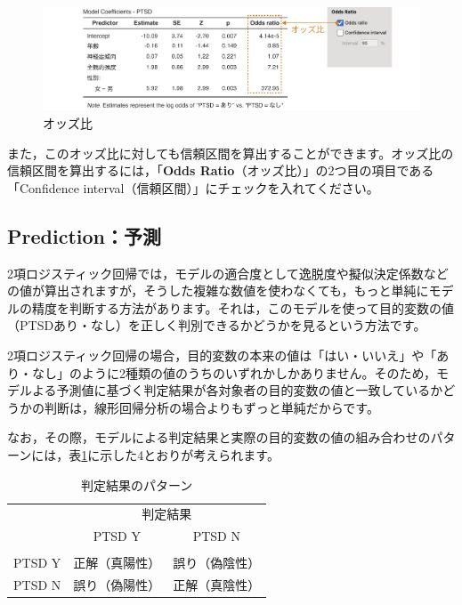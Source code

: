 \documentclass[
  12pt,
  a5jpaper,
  lualatex, ja=standard]{bxjsbook}
\begin{document}
\begin{figure}[!ht]

{\centering \includegraphics[width=1\linewidth]{images/regression/binomial-oddsratio} 

}

\caption{オッズ比}\label{fig:regression-binomial-oddsratio}
\end{figure}

また，このオッズ比に対しても信頼区間を算出することができます。オッズ比の信頼区間を算出するには，「\textbf{Odds Ratio}（オッズ比）」の2つ目の項目である「Confidence interval（信頼区間）」にチェックを入れてください。

\hypertarget{sub:regression-binomial-prediction}{%
\subsection{Prediction：予測}\label{sub:regression-binomial-prediction}}

2項ロジスティック回帰では，モデルの適合度として逸脱度や擬似決定係数などの値が算出されますが，そうした複雑な数値を使わなくても，もっと単純にモデルの精度を判断する方法があります。それは，このモデルを使って目的変数の値（PTSDあり・なし）を正しく判別できるかどうかを見るという方法です。

2項ロジスティック回帰の場合，目的変数の本来の値は「はい・いいえ」や「あり・なし」のように2種類の値のうちのいずれかしかありません。そのため，モデルよる予測値に基づく判定結果が各対象者の目的変数の値と一致しているかどうかの判断は，線形回帰分析の場合よりもずっと単純だからです。

なお，その際，モデルによる判定結果と実際の目的変数の値の組み合わせのパターンには，表\ref{tab:regression-binomial-crosstable}に示した4とおりが考えられます。

\begin{table}[H]

\caption{\label{tab:regression-binomial-crosstable}判定結果のパターン}
\centering
\begin{tabular}[t]{lcc}
\toprule
\multicolumn{1}{c}{ } & \multicolumn{2}{c}{判定結果} \\
\cmidrule(l{3pt}r{3pt}){2-3}
  & PTSD Y & PTSD N\\
\midrule
\addlinespace[0.3em]
\multicolumn{3}{l}{\textbf{実際の値}}\\
\hspace{1em}PTSD Y & 正解（真陽性） & 誤り（偽陰性）\\
\hspace{1em}PTSD N & 誤り（偽陽性） & 正解（真陰性）\\
\bottomrule
\end{tabular}
\end{table}
\end{document}
